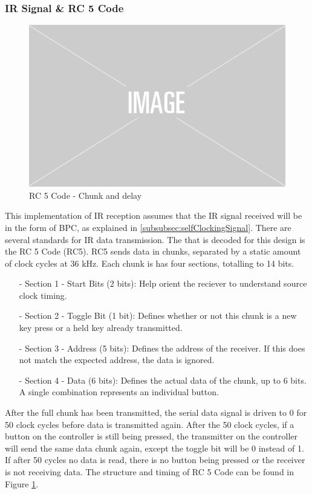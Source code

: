 \documentclass[]{article}
\begin{document}
\subsubsection{IR Signal \& RC 5 Code}
\begin{figure}[H]\centering
    \includegraphics[width=0.5\linewidth]{figures/placeholder.png}
    \caption{RC 5 Code - Chunk and delay}
    \label{fig:rc5Code}
\end{figure}
This implementation of IR reception assumes that the IR signal received will be in the form of BPC, as explained in \ref{subsubsec:selfClockingSignal}.
There are several standards for IR data transmission. The that is decoded for this design is the RC 5 Code (RC5).
RC5 sends data in chunks, separated by a static amount of clock cycles at 36 kHz. Each chunk is has four sections, totalling to 14 bits.
\begin{itemize}
    \item[-] Section 1 - Start Bits (2 bits): Help orient the reciever to understand source clock timing.
    \item[-] Section 2 - Toggle Bit (1 bit): Defines whether or not this chunk is a new key press or a held key already transmitted.
    \item[-] Section 3 - Address (5 bits): Defines the address of the receiver. If this does not match the expected address, the data is ignored.
    \item[-] Section 4 - Data (6 bits): Defines the actual data of the chunk, up to 6 bits. A single combination represents an individual button.
\end{itemize}
After the full chunk has been transmitted, the serial data signal is driven to 0 for 50 clock cycles before data is transmitted again.
After the 50 clock cycles, if a button on the controller is still being pressed, the transmitter on the controller will send the same data chunk again, except the toggle bit will be 0 instead of 1.
If after 50 cycles no data is read, there is no button being pressed or the receiver is not receiving data.\cite{vishayIr}
The structure and timing of RC 5 Code can be found in Figure \ref{fig:rc5Code}.
\end{document}
